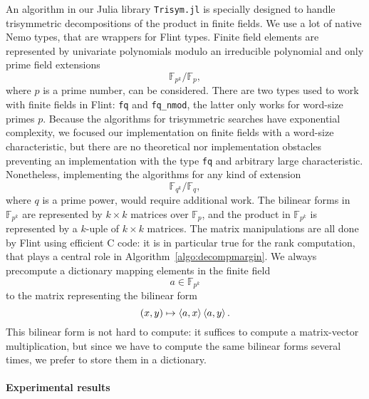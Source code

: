 An algorithm in our Julia library \texttt{Trisym.jl} is specially designed to
handle trisymmetric decompositions of the product in finite fields. We use a lot
of native Nemo types, that are wrappers for Flint types. Finite field elements
are represented by univariate polynomials modulo an irreducible polynomial and
only prime field extensions
\[
  \mathbb{F}_{p^k}/\mathbb{F}_p,
\]
where $p$ is a prime number, can be considered.
There are two types used to work with finite fields in Flint: \texttt{fq} and
\texttt{fq\_nmod}, the latter only works for word-size primes $p$. Because the
algorithms for trisymmetric searches have exponential complexity, we focused
our implementation on finite fields with a word-size characteristic, but there
are no theoretical nor implementation obstacles preventing an
implementation with the type \texttt{fq} and arbitrary large characteristic.
Nonetheless, implementing the algorithms for any kind of extension
\[
  \mathbb{F}_{q^k}/\mathbb{F}_q,
\]
where $q$ is a prime power, would require additional work.
The
bilinear forms in $\mathbb{F}_{p^k}$ are represented by $k\times k$ matrices
over $\mathbb{F}_p$, and the product in $\mathbb{F}_{p^k}$ is represented by a
$k$-uple of $k\times k$ matrices. The matrix manipulations are all done by Flint using
efficient C code: it is in particular true for the rank computation, that plays a central role
in Algorithm~\ref{algo:decompmargin}. We always precompute a dictionary mapping
elements in the finite field
\[
  a\in\mathbb{F}_{p^k}
\]
to the matrix representing the bilinear form
\[
  (x, y)\mapsto\left\langle a,x\right\rangle\left\langle a,y\right\rangle.
\]
This bilinear form is not hard to compute: it suffices to compute a
matrix-vector multiplication, but since we have to compute the same bilinear
forms several times, we prefer to store them in a dictionary.

\paragraph{Experimental results}


